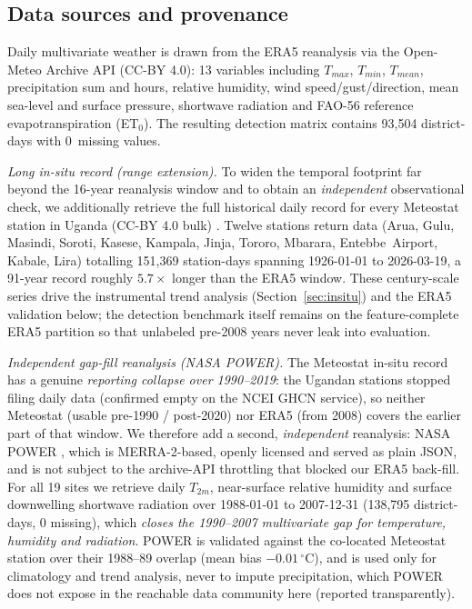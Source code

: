 \documentclass[preprint,12pt]{elsarticle}
\begin{document}
\subsection{Data sources and provenance}
Daily multivariate weather is drawn from the ERA5 reanalysis
\cite{hersbach2020} via the Open-Meteo Archive API \cite{openmeteo2022}
(CC-BY 4.0): 13 variables
including $T_{max}$, $T_{min}$, $T_{mean}$, precipitation sum and hours,
relative humidity, wind speed/gust/direction, mean sea-level and surface
pressure, shortwave radiation and FAO-56 reference evapotranspiration
(ET$_0$). The resulting detection matrix contains 93{,}504 district-days with
0\, missing values.

\emph{Long in-situ record (range extension).} To widen the temporal footprint
far beyond the 16-year reanalysis window and to obtain an \emph{independent}
observational check, we additionally retrieve the full historical daily record
for every Meteostat station in Uganda (CC-BY 4.0 bulk) \cite{meteostat2020}.
Twelve stations return data (Arua, Gulu, Masindi, Soroti, Kasese, Kampala,
Jinja, Tororo, Mbarara, Entebbe~Airport, Kabale, Lira) totalling 151{,}369
station-days spanning 1926-01-01 to 2026-03-19, a 91-year record roughly
$5.7\times$ longer than the ERA5 window. These century-scale series drive the
instrumental trend analysis (Section~\ref{sec:insitu}) and the ERA5
validation below; the detection benchmark itself remains on the feature-complete
ERA5 partition so that unlabeled pre-2008 years never leak into evaluation.

\emph{Independent gap-fill reanalysis (NASA POWER).} The Meteostat in-situ
record has a genuine \emph{reporting collapse over 1990--2019}: the Ugandan
stations stopped filing daily data (confirmed empty on the NCEI GHCN service),
so neither Meteostat (usable pre-1990 / post-2020) nor ERA5 (from 2008) covers
the earlier part of that window. We therefore add a second, \emph{independent}
reanalysis: NASA POWER
\cite{power2024dataset}, which is MERRA-2-based, openly licensed and served as
plain JSON, and is not subject to the archive-API throttling that blocked our
ERA5 back-fill.
For all 19 sites we retrieve daily $T_{2m}$, near-surface relative
humidity and surface downwelling shortwave radiation over
1988-01-01 to 2007-12-31 (138{,}795 district-days, 0 missing), which
\emph{closes the 1990--2007 multivariate gap for temperature, humidity and
radiation}. POWER is validated against the co-located Meteostat station over
their 1988--89 overlap (mean bias $-0.01$\,$^\circ$C), and is used only for
climatology and trend analysis, never to impute precipitation, which POWER does
not expose in the reachable data community here (reported transparently).
\end{document}
